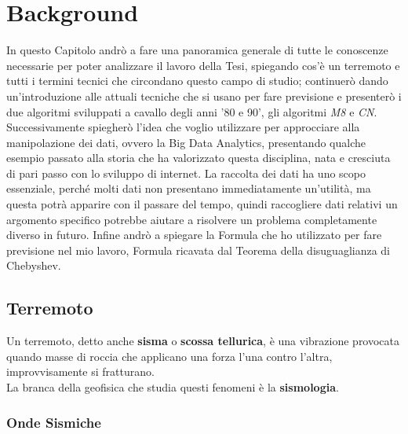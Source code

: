 \chapter{Background}\label{background}

In questo Capitolo andr\`o a fare una panoramica generale di tutte le conoscenze necessarie per poter analizzare il lavoro della Tesi, spiegando cos'\`e un terremoto e tutti i termini tecnici che circondano questo campo di studio; continuer\`o dando un'introduzione alle attuali tecniche che si usano per fare previsione e presenter\`o i due algoritmi sviluppati a cavallo degli anni '80 e 90', gli algoritmi \textit{M8} e \textit{CN}. Successivamente spiegher\`o l'idea che voglio utilizzare per approcciare alla manipolazione dei dati, ovvero la Big Data Analytics, presentando qualche esempio passato alla storia che ha valorizzato questa disciplina, nata e cresciuta di pari passo con lo sviluppo di internet. La raccolta dei dati ha uno scopo essenziale, perch\'e molti dati non presentano immediatamente un'utilit\`a, ma questa potr\`a apparire con il passare del tempo, quindi raccogliere dati relativi un argomento specifico potrebbe aiutare a risolvere un problema completamente diverso in futuro. Infine andr\`o a spiegare la Formula che ho utilizzato per fare previsione nel mio lavoro, Formula ricavata dal Teorema della disuguaglianza di Chebyshev.

\section{Terremoto}\label{terremoto}
Un terremoto, detto anche \textbf{sisma} o \textbf{scossa tellurica}, \`e una vibrazione provocata quando masse di roccia che applicano una forza l'una contro l'altra, improvvisamente si fratturano.\\
La branca della geofisica che studia questi fenomeni \`e la \textbf{sismologia}.

\subsection{Onde Sismiche}


